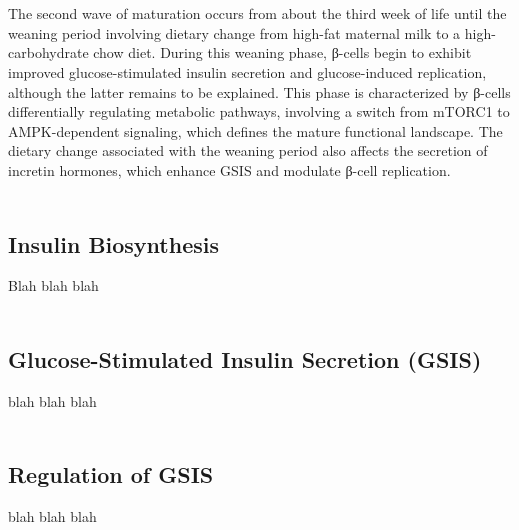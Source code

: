 \\\\
The second wave of maturation occurs from about the third week of life until the weaning period involving dietary change from high-fat maternal milk to a high-carbohydrate chow diet. During this weaning phase, β-cells begin to exhibit improved glucose-stimulated insulin secretion and glucose-induced replication, although the latter remains to be explained. This phase is characterized by β-cells differentially regulating metabolic pathways, involving a switch from mTORC1 to AMPK-dependent signaling, which defines the mature functional landscape. The dietary change associated with the weaning period also affects the secretion of incretin hormones, which enhance GSIS and modulate β-cell replication.
\\\\
\subsection{Insulin Biosynthesis} %
\label{sec:insbio}
Blah blah blah
\\\\
\subsection{Glucose-Stimulated Insulin Secretion (GSIS)} %
\label{sec:gsis}
blah blah blah
\\\\
\subsection{Regulation of GSIS} %
\label{sec:reggsis}
blah blah blah
\\\\
